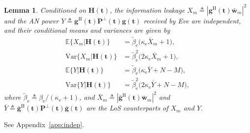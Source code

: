 \documentclass[journal]{IEEEtran}
\newtheorem{lemma}{Lemma}
\newcommand{\E}{\mathbb{E}}
\newcommand{\bt}{\mathbf{t}}
\newcommand{\bg}{\mathbf{g}}
\newcommand{\gb}{\bar{\mathbf{g}}}
\newcommand{\bH}{\mathbf{H}}
\newcommand{\wb}{\bar{\mathbf{w}}}
\newcommand{\PHp}{\mathbf{P}^{\perp}(\bt)}
\begin{document}
\begin{lemma}\label{lem:indep}
Conditioned on $\bH(\bt)$, the information leakage $X_m\triangleq|\bg^{\mathrm{H}}(\bt)\wb_m|^2$ and the AN power $Y\triangleq\bg^{\mathrm{H}}(\bt)\PHp\bg(\bt)$ received by Eve are independent, and their conditional means and variances are given by
\begin{align}
\E\{X_m|\bH(\bt)\}&=\tilde\beta_{\mathrm{e}}\big(\kappa_{\mathrm{e}}\bar X_m+1\big),\nonumber\\
\mathrm{Var}\{X_m|\bH(\bt)\}&=\tilde\beta_{\mathrm{e}}^2\big(2\kappa_{\mathrm{e}}\bar X_m+1\big),\label{eq:EX}\\
\E\{Y|\bH(\bt)\}&=\tilde\beta_{\mathrm{e}}\big(\kappa_{\mathrm{e}}\bar Y+N-M\big),\nonumber\\
\mathrm{Var}\{Y|\bH(\bt)\}&=\tilde\beta_{\mathrm{e}}^2\big(2\kappa_{\mathrm{e}}\bar Y+N-M\big),\label{eq:EY}
\end{align}
where $\tilde\beta_{\mathrm{e}}\triangleq\beta_{\mathrm{e}}/(\kappa_{\mathrm{e}}+1)$, and $\bar X_m\triangleq|\gb^{\mathrm{H}}(\bt)\wb_m|^2$ and $\bar Y\triangleq\gb^{\mathrm{H}}(\bt)\PHp\gb(\bt)$ are the LoS counterparts of $X_m$ and $Y$.
\end{lemma}
\begin{IEEEproof}
See Appendix~\ref{app:indep}.
\end{IEEEproof}
\end{document}
